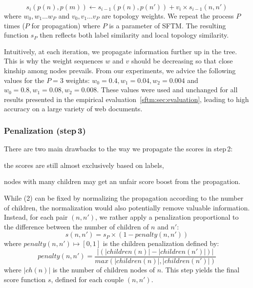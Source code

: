 \begin{equation}\label{eq:score_parent}
	s_{i}(p(n), p(m)) \gets s_{i-1}(p(n), p(n')) +  v_i \times s_{i-1}(n, n')
\end{equation}
where $w_0, w_1\dots w_{P}$ and $v_0, v_1 ... v_P$ are topology weights.
We repeat the process $P$ times ($P$ for propagation) where $P$ is a parameter of SFTM.
The resulting function $s_{P}$ then reflects both label similarity and local topology similarity.

Intuitively, at each iteration, we propagate information further up in the tree.
This is why the weight sequences $w$ and $v$ should be decreasing so that close kinship among nodes prevails.
From our experiments, we advice the following values for the $P=3$ weights: $w_0 = 0.4, w_1 = 0.04, w_2 = 0.004$ and $w_0 = 0.8, w_1 = 0.08, w_2 = 0.008$.
These values were used and unchanged for all results presented in the empirical evaluation~\ref{sftm:sec:evaluation}, leading to high accuracy on a large variety of web documents.

\subsubsection{Penalization (step\,3)}
There are two main drawbacks to the way we propagate the scores in step\,2:
\begin{inparaenum}
\item the scores are still almost exclusively based on labels,
\item nodes with many children may get an unfair score boost from the propagation.
\end{inparaenum}

While (2) can be fixed by normalizing the propagation according to the number of children, the normalization would also potentially remove valuable information.
Instead, for each pair $(n,n')$, we rather apply a penalization proportional to the difference between the number of children of $n$ and $n'$:
\begin{equation}
s(n,n') = s_{P} \times (1 - penalty(n,n'))
\end{equation}
where $penalty(n,n') \mapsto [0, 1]$ is the children penalization defined by:
\begin{equation}
penalty(n,n') = \frac{|(|children(n)|-|children(n')|)|}{max(|children(n)|,|children(n')|)}
\end{equation}
where $|ch(n)|$ is the number of children nodes of $n$.
This step yields the final score function $s$, defined for each couple $(n,n')$.

